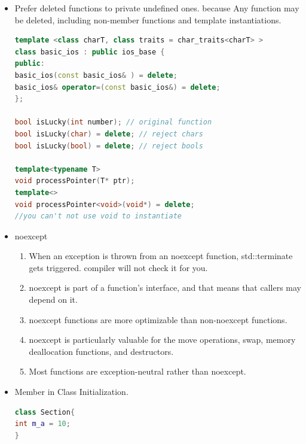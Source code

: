\documentclass[a4paper,12pt,twoside]{book}
\begin{document}
\begin{itemize}
\item Prefer deleted functions to private undefined ones. because Any function may be deleted, including non-member functions and template instantiations.

\begin{lstlisting}[frame=single, language=c++]
template <class charT, class traits = char_traits<charT> >
class basic_ios : public ios_base {
public:
basic_ios(const basic_ios& ) = delete;
basic_ios& operator=(const basic_ios&) = delete;
};

bool isLucky(int number); // original function
bool isLucky(char) = delete; // reject chars
bool isLucky(bool) = delete; // reject bools

template<typename T>
void processPointer(T* ptr);
template<>
void processPointer<void>(void*) = delete;
//you can't not use void to instantiate
\end{lstlisting} 

\item noexcept

\begin{enumerate}

\item  When an exception is thrown from an noexcept function, std::terminate gets triggered. compiler will not check it for you.



\item noexcept is part of a function's interface, and that means that callers may
depend on it.

\item noexcept functions are more optimizable than non-noexcept functions.

\item noexcept is particularly valuable for the move operations, swap, memory deallocation functions, and destructors.

\item Most functions are exception-neutral rather than noexcept.

\end{enumerate}


\item Member in Class Initialization.
\begin{lstlisting}[frame=single, language=c++]
class Section{
int m_a = 10;
}
\end{lstlisting}

\end{itemize}
\end{document}
